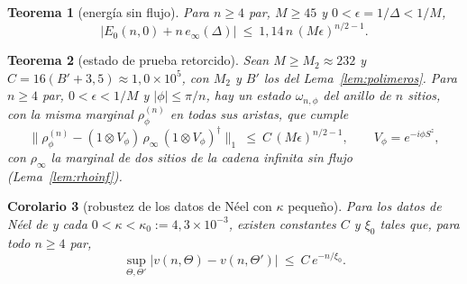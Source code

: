 \documentclass[11pt,a4paper]{article}
\newtheorem{teorema}{Teorema}
\newtheorem{corolario}[teorema]{Corolario}
\theoremstyle{remark}
\begin{document}
\begin{teorema}[energía sin flujo]\label{teo:energia}
Para $n\ge4$ par, $M\ge45$ y $0<\epsilon=1/\Delta<1/M$,
\[
  \big|E_0(n,0)+n\,e_\infty(\Delta)\big|\ \le\ 1{,}14\,n\,(M\epsilon)^{n/2-1}.
\]
\end{teorema}

\begin{teorema}[estado de prueba retorcido]\label{teo:prueba}
Sean $M\ge M_2\approx232$ y $C=16(B'+3{,}5)\approx1{,}0\times10^5$, con $M_2$ y $B'$ los del
Lema~\ref{lem:polimeros}. Para $n\ge4$
par, $0<\epsilon<1/M$ y $|\phi|\le\pi/n$, hay un estado
$\omega_{n,\phi}$ del anillo de $n$ sitios, con la misma marginal $\rho^{(n)}_\phi$ en todas sus aristas,
que cumple
\[
  \big\|\rho^{(n)}_\phi-(1\otimes V_\phi)\,\rho_\infty\,(1\otimes V_\phi)^\dagger\big\|_1\ \le\ C\,(M\epsilon)^{n/2-1},
  \qquad V_\phi=e^{-i\phi S^z},
\]
con $\rho_\infty$ la marginal de dos sitios de la cadena infinita sin flujo (Lema~\ref{lem:rhoinf}).
\end{teorema}

\begin{corolario}[robustez de los datos de Néel con $\kappa$ pequeño]\label{cor:robustez}
Para los datos de Néel de \cite[Sec.~6]{robustez} y cada $0<\kappa<\kappa_0:=4{,}3\times10^{-3}$, existen
constantes $C$ y $\xi_0$ tales que, para todo $n\ge4$ par,
\[
  \sup_{\Theta,\Theta'}|v(n,\Theta)-v(n,\Theta')|\ \le\ C\,e^{-n/\xi_0}.
\]
\end{corolario}
\end{document}
